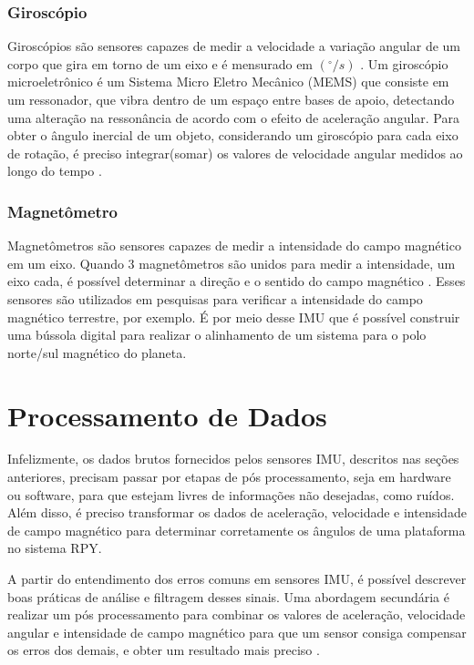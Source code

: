 \subsubsection{Giroscópio}

Giroscópios são sensores capazes de medir a velocidade a variação angular de um corpo que gira em torno de um eixo e é mensurado em $ (^{\circ}/s) $ \cite{diss:FabioAUV}. Um giroscópio microeletrônico é um Sistema Micro Eletro Mecânico (MEMS) que consiste em um ressonador, que vibra dentro de um espaço entre bases de apoio, detectando uma alteração na ressonância de acordo com o efeito de aceleração angular. Para obter o ângulo inercial de um objeto, considerando um giroscópio para cada eixo de rotação, é preciso integrar(somar) os valores de velocidade angular medidos ao longo do tempo \cite{tcc:viniciusPID2Graus}.

\subsubsection{Magnetômetro}
Magnetômetros são sensores capazes de medir a intensidade do campo magnético em um eixo. Quando 3 magnetômetros são unidos para medir a intensidade, um eixo cada, é possível determinar a direção e o sentido do campo magnético \cite{tcc:rafaelEESC}. Esses sensores são utilizados em pesquisas para verificar a intensidade do campo magnético terrestre, por exemplo. É por meio desse IMU que é possível construir uma bússola digital para realizar o alinhamento de um sistema para o polo norte/sul magnético do planeta.


\section{Processamento de Dados}

Infelizmente, os dados brutos fornecidos pelos sensores IMU, descritos nas seções anteriores, precisam passar por etapas de pós processamento, seja em hardware ou software, para que estejam livres de informações não desejadas, como ruídos. Além disso, é preciso transformar os dados de aceleração, velocidade e intensidade de campo magnético para determinar corretamente os ângulos de uma plataforma no sistema RPY. 

A partir do entendimento dos erros comuns em sensores IMU, é possível descrever boas práticas de análise e filtragem desses sinais. Uma abordagem secundária é realizar um pós processamento para combinar os valores de aceleração, velocidade angular e intensidade de campo magnético para que um sensor consiga compensar os erros dos demais, e obter um resultado mais preciso \cite{manual:cambimu}.

